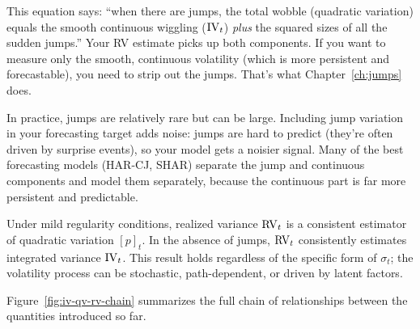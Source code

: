 \begin{intuition}
This equation says: ``when there are jumps, the total wobble (quadratic variation) equals the smooth continuous wiggling ($\operatorname{IV}_t$) \emph{plus} the squared sizes of all the sudden jumps.''
Your RV estimate picks up both components.
If you want to measure only the smooth, continuous volatility (which is more persistent and forecastable), you need to strip out the jumps.
That's what Chapter~\ref{ch:jumps} does.
\end{intuition}

\begin{projectconnection}
In practice, jumps are relatively rare but can be large.
Including jump variation in your forecasting target adds noise: jumps are hard to predict (they're often driven by surprise events), so your model gets a noisier signal.
Many of the best forecasting models (HAR-CJ, SHAR) separate the jump and continuous components and model them separately, because the continuous part is far more persistent and predictable.
\end{projectconnection}

\begin{keyresult}
Under mild regularity conditions, realized variance $\operatorname{RV}_t$ is a consistent estimator of quadratic variation $[p]_t$.
In the absence of jumps, $\operatorname{RV}_t$ consistently estimates integrated variance $\operatorname{IV}_t$.
This result holds regardless of the specific form of $\sigma_t$; the volatility process can be stochastic, path-dependent, or driven by latent factors.
\end{keyresult}

Figure~\ref{fig:iv-qv-rv-chain} summarizes the full chain of relationships between the quantities introduced so far.

